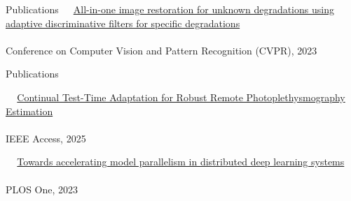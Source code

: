 \documentclass{resume} %
\begin{document}
\begin{rSection}{Publications {}}
\textbullet~\,\, \href{https://ieeexplore.ieee.org/document/10204770}{All-in-one image restoration for unknown degradations using adaptive discriminative filters for specific degradations}
\\ 
\\ \hspace*{1.5em}Conference on Computer Vision and Pattern Recognition (CVPR), 2023

\end{rSection}



\begin{rSection}{Publications {}}

\textbullet~\,\, \href{https://ieeexplore.ieee.org/document/10938539}{Continual Test-Time Adaptation for Robust Remote Photoplethysmography Estimation}
\\ 
\\ \hspace*{1.5em}IEEE Access, 2025

\textbullet~\,\, \href{https://journals.plos.org/plosone/article?id=10.1371/journal.pone.0293338}{Towards accelerating model parallelism in distributed deep learning systems}
\\ 
\\ \hspace*{1.5em}PLOS One, 2023

\end{rSection} 
\end{document}
